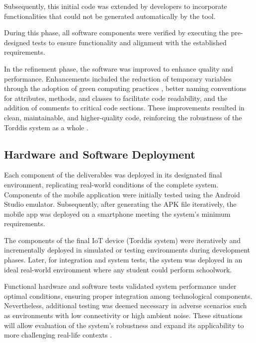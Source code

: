                 Subsequently, this initial code was extended by developers to incorporate functionalities that could not be generated automatically by the tool.
                
                During this phase, all software components were verified by executing the pre-designed tests to ensure functionality and alignment with the established requirements.
                
                In the refinement phase, the software was improved to enhance quality and performance. Enhancements included the reduction of temporary variables through the adoption of green computing practices \citep{Firmansyah2024Integrating}, better naming conventions for attributes, methods, and classes to facilitate code readability, and the addition of comments to critical code sections. These improvements resulted in clean, maintainable, and higher-quality code, reinforcing the robustness of the Torddis system as a whole \citep{Marabesi2024Exploring}.
                
                \subsection{Hardware and Software Deployment}
                Each component of the deliverables was deployed in its designated final environment, replicating real-world conditions of the complete system. Components of the mobile application were initially tested using the Android Studio emulator. Subsequently, after generating the APK file iteratively, the mobile app was deployed on a smartphone meeting the system's minimum requirements.
                
                The components of the final IoT device (Torddis system) were iteratively and incrementally deployed in simulated or testing environments during development phases. Later, for integration and system tests, the system was deployed in an ideal real-world environment where any student could perform schoolwork.
                
                Functional hardware and software tests validated system performance under optimal conditions, ensuring proper integration among technological components. Nevertheless, additional testing was deemed necessary in adverse scenarios such as environments with low connectivity or high ambient noise. These situations will allow evaluation of the system’s robustness and expand its applicability to more challenging real-life contexts \citep{Falzetti2024Promoting}.
                
